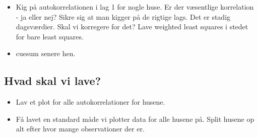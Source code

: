 \begin{itemize}
    \item Kig på autokorrelationen i lag 1 for nogle huse. Er der væsentlige korrelation - ja eller nej? Sikre sig at man kigger på de rigtige lags. Det er stadig dagsværdier. Skal vi korregere for det? Lave weighted least squares i stedet for bare least squares.
    \item cuesum senere hen. 
\end{itemize}

\subsection{Hvad skal vi lave?}
\begin{itemize}
    \item Lav et plot for alle autokorrelationer for husene. 
    \item Få lavet en standard måde vi plotter data for alle husene på. Split husene op alt efter hvor mange observationer der er. 
\end{itemize}

